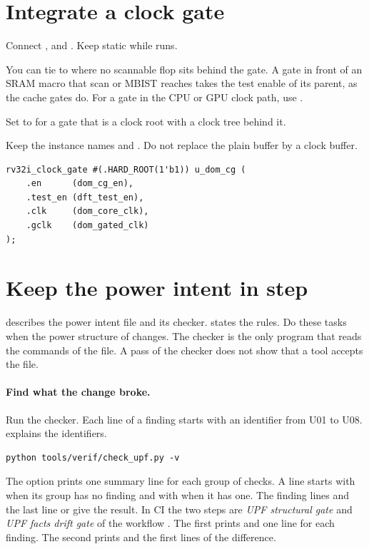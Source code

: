 \section{Integrate a clock gate}\label{um:ch:power-integration:gate}
\begin{procedure}
  \item Connect ,  and . Keep  static while  runs.
  \item You can tie  to  where no scannable flop sits behind the gate. A gate in front of an SRAM macro that scan or MBIST reaches takes the test enable of its parent, as the cache gates do. For a gate in the CPU or GPU clock path, use .
  \item Set  to  for a gate that is a clock root with a clock tree behind it.
  \item Keep the instance names  and . Do not replace the plain buffer  by a clock buffer.
\end{procedure}
\begin{lstlisting}
rv32i_clock_gate #(.HARD_ROOT(1'b1)) u_dom_cg (
    .en      (dom_cg_en),
    .test_en (dft_test_en),
    .clk     (dom_core_clk),
    .gclk    (dom_gated_clk)
);
\end{lstlisting}

\section{Keep the power intent in step}\label{um:ch:power-integration:upf}
 describes the power intent file and its checker.  states the rules. Do these tasks when the power structure of  changes. The checker is the only program that reads the commands of the file. A pass of the checker does not show that a tool accepts the file.

\paragraph{Find what the change broke.} Run the checker. Each line of a finding starts with an identifier from U01 to U08.  explains the identifiers.
\begin{lstlisting}
python tools/verif/check_upf.py -v
\end{lstlisting}
The option  prints one summary line for each group of checks. A line starts with  when its group has no finding and with  when it has one. The finding lines and the last line  or  give the result. In CI the two steps are \textit{UPF structural gate} and \textit{UPF facts drift gate} of the workflow . The first prints  and one line for each finding. The second prints  and the first lines of the difference.

